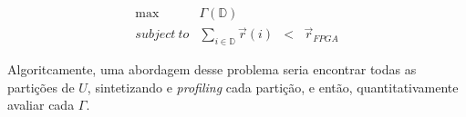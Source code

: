 			\begin{equation}
					\begin{array}{rrcl}
					\text{max}                 & \Gamma ( \mathbb{D})               & ~   & ~                \\
					subject\ to & \sum_{i \in \mathbb{D}} \vec{r}(i) & < & \vec{r}_{FPGA}
					\end{array}
                    \label{eq:constraints}
			\end{equation}

		Algoritcamente, uma abordagem desse problema seria encontrar todas as partições de $ U $, sintetizando e \textit{profiling} cada partição, e então, quantitativamente avaliar cada $ \Gamma $. 

